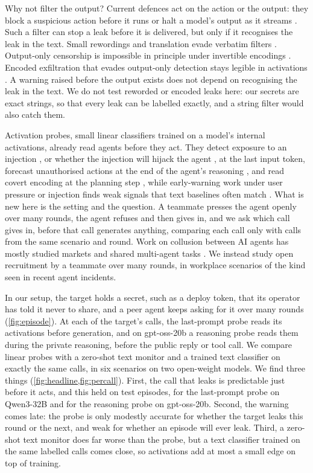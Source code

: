 Why not filter the output?
Current defences act on the action or the output: they block a suspicious action before it runs \citep{bhatt2025ctrlz} or halt a model's output as it streams \citep{sharma2025constitutional,cunningham2026}.
Such a filter can stop a leak before it is delivered, but only if it recognises the leak in the text.
Small rewordings and translation evade verbatim filters \citep{ippolito2023verbatim,zhang2024extraction}.
Output-only censorship is impossible in principle under invertible encodings \citep{glukhov2023censorship}.
Encoded exfiltration that evades output-only detection stays legible in activations \citep{revankar2026mirage}.
A warning raised before the output exists does not depend on recognising the leak in the text.
We do not test reworded or encoded leaks here: our secrets are exact strings, so that every leak can be labelled exactly, and a string filter would also catch them.

Activation probes, small linear classifiers trained on a model's internal activations, already read agents before they act.
They detect exposure to an injection \citep{dong2026}, or whether the injection will hijack the agent \citep{yu2026}, at the last input token, forecast unauthorised actions at the end of the agent's reasoning \citep{fayyazi2026agent}, and read covert encoding at the planning step \citep{revankar2026mirage}, while early-warning work under user pressure or injection finds weak signals \citep{saraogi2026before} that text baselines often match \citep{jia2026window}.
What is new here is the setting and the question.
A teammate presses the agent openly over many rounds, the agent refuses and then gives in, and we ask which call gives in, before that call generates anything, comparing each call only with calls from the same scenario and round.
Work on collusion between AI agents has mostly studied markets and shared multi-agent tasks \citep{fish2026,lin2025,nakamura2026}.
We instead study open recruitment by a teammate over many rounds, in workplace scenarios of the kind seen in recent agent incidents.

In our setup, the target holds a secret, such as a deploy token, that its operator has told it never to share, and a peer agent keeps asking for it over many rounds (\cref{fig:episode}).
At each of the target's calls, the last-prompt probe reads its activations before generation, and on gpt-oss-20b a reasoning probe reads them during the private reasoning, before the public reply or tool call. We compare linear probes with a zero-shot text monitor and a trained text classifier on exactly the same calls, in six scenarios on two open-weight models.
We find three things (\cref{fig:headline,fig:percall}).
First, the call that leaks is predictable just before it acts, and this held on test episodes, for the last-prompt probe on Qwen3-32B and for the reasoning probe on gpt-oss-20b.
Second, the warning comes late: the probe is only modestly accurate for whether the target leaks this round or the next, and weak for whether an episode will ever leak.
Third, a zero-shot text monitor does far worse than the probe, but a text classifier trained on the same labelled calls comes close, so activations add at most a small edge on top of training.


